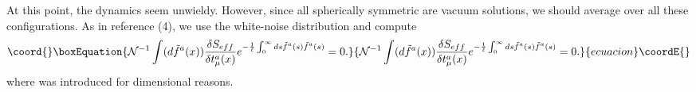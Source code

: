 \documentclass[a4paper,12pt]{article}
\begin{document}
At this point, the dynamics seem unwieldy.  However, since all spherically symmetric \coordHE{} are vacuum solutions, we should average over all these configurations.  As in reference (4), we use the white-noise distribution and compute
\begin{equation}\coord{}\boxEquation{\label{17}
\mathcal{N}^{-1}\int(d\tilde{f}^{a}(x))\frac{\delta S_{eff}}{\delta t^{a}_{\mu}(x)}e^{-\frac{1}{\ell}\int^{\infty}_{0}ds\tilde{f}^{a}(s)\tilde{f}^{a}(s)} = 0.
}{\mathcal{N}^{-1}\int(d\tilde{f}^{a}(x))\frac{\delta S_{eff}}{\delta t^{a}_{\mu}(x)}e^{-\frac{1}{\ell}\int^{\infty}_{0}ds\tilde{f}^{a}(s)\tilde{f}^{a}(s)} = 0.
}{ecuacion}\coordE{}\end{equation}
where \myHighlight{$\ell$}\coordHE{} was introduced for dimensional reasons.\\
\end{document}
